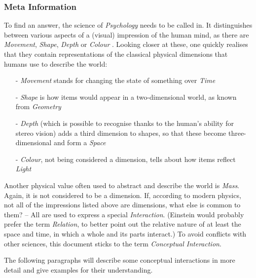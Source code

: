 %
%
%
%
%
%
%

\subsubsection{Meta Information}
\label{meta_information_heading}

To find an answer, the science of \emph{Psychology} needs to be called in. It
distinguishes between various aspects of a (visual) impression of the human
mind, as there are \emph{Movement}, \emph{Shape}, \emph{Depth} or \emph{Colour}
\cite{stoerig}. Looking closer at these, one quickly realises that they contain
representations of the classical physical dimensions that humans use to
describe the world:

\begin{itemize}
    \item[-] \emph{Movement} stands for changing the state of something over
        \emph{Time}
    \item[-] \emph{Shape} is how items would appear in a two-dimensional world,
        as known from \emph{Geometry}
    \item[-] \emph{Depth} (which is possible to recognise thanks to the human's
        ability for stereo vision) adds a third dimension to shapes, so that
        these become three-dimensional and form a \emph{Space}
    \item[-] \emph{Colour}, not being considered a dimension, tells about how
        items reflect \emph{Light}
\end{itemize}

Another physical value often used to abstract and describe the world is
\emph{Mass}. Again, it is not considered to be a dimension. If, according to
modern physics, not all of the impressions listed above are dimensions, what
else is common to them? -- All are used to express a special \emph{Interaction}.
(Einstein \cite{einstein} would probably prefer the term \emph{Relation}, to
better point out the relative nature of at least the space and time, in which a
whole and its parts interact.) To avoid conflicts with other sciences, this
document sticks to the term \emph{Conceptual Interaction}.

The following paragraphs will describe some conceptual interactions in more
detail and give examples for their understanding.

